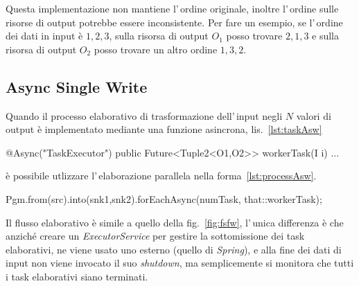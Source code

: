 Questa implementazione non mantiene l'\,ordine originale, inoltre l'\,ordine
sulle risorse di output potrebbe essere inconsistente.
Per fare un esempio, se l'\,ordine dei dati in input è $1,2,3$, sulla risorsa di
output $O_1$ posso trovare $2,1,3$ e sulla risorsa di output $O_2$ posso trovare
un altro ordine $1,3,2$.


\subsection{Async Single Write} \label{sec:asw}
Quando il processo elaborativo di trasformazione dell'\,input negli $N$ valori
di output è implementato mediante una funzione asincrona, lis.~\ref{lst:taskAsw}
\begin{elisting}[!htb]
\begin{javacode}
    @Async("TaskExecutor")
    public Future<Tuple2<O1,O2>> workerTask(I i) { ... }
\end{javacode}
\caption{task $1\mapsto N$ asincrono (ASW)}
\label{lst:taskAsw}
\end{elisting}
è possibile utlizzare l'\,elaborazione parallela nella
forma~\ref{lst:processAsw}.
\begin{elisting}[!htb]
\begin{javacode}
Pgm.from(src).into(snk1,snk2).forEachAsync(numTask, that::workerTask);
\end{javacode}
\caption{elaborazione $1\mapsto N$ asincrona (ASW)}
\label{lst:processAsw}
\end{elisting}
Il flusso elaborativo è simile a quello della fig.~\ref{fig:fsfw}, l'\,unica
differenza è che anziché creare un \textsl{ExecutorService} per gestire la
sottomissione dei task elaborativi, ne viene usato uno esterno (quello di
\textit{Spring}), e alla fine dei dati di input non viene invocato il suo
\textsl{shutdown}, ma semplicemente si monitora che tutti i task elaborativi
siano terminati.

